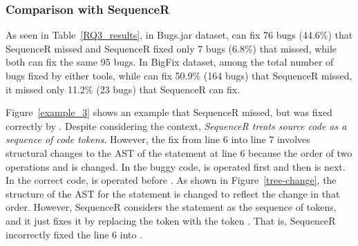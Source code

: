 


\subsubsection{\bf Comparison with SequenceR}

As seen in Table~\ref{RQ3_results}, in Bugs.jar dataset, {\tool} can
fix 76 bugs (44.6\%) that SequenceR missed and SequenceR fixed only 7
bugs (6.8\%) that {\tool} missed, while both can fix the same 95 bugs.
In BigFix dataset, among the total number of bugs fixed by either
tools, while {\tool} can fix 50.9\% (164 bugs) that SequenceR missed,
it missed only 11.2\% (23 bugs) that SequenceR can fix.

Figure~\ref{example_3} shows an example that SequenceR missed, but was
fixed correctly by {\tool}. Despite considering the context, {\em
  SequenceR treats source code as a sequence of code tokens}. However,
the fix from line 6 into line 7 involves structural changes to the AST
of the statement at line 6 because the order of two operations
 and \code{\%} is changed.  In the buggy code,  is
operated first and then \code{\%} is next. In the correct code,
\code{\%} is operated before . As shown in
Figure~\ref{tree-change}, the structure of the AST for the statement
is changed to reflect the change in that order. However, SequenceR
considers the statement as the sequence of tokens, and it just fixes
it by replacing the token  with the token
. That is, SequenceR incorrectly fixed the line 6 into
    
\code{\%} .


